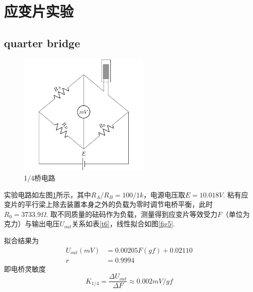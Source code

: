 \documentclass[12pt, a4paper]{ctexart}
\begin{document}
\section{应变片实验}
\subsection{quarter bridge}

\begin{figure}
    \includegraphics[width=2.5in]{figure/quarter bridge.png}
    \caption{1/4桥电路}
    \label{fig4}
\end{figure}

实验电路如左图\ref{fig4}所示，其中$R_A/R_B = 100/1k$，电源电压取$E = 10.018V$.
粘有应变片的平行梁上除去装置本身之外的负载为零时调节电桥平衡，此时$R_0 = 3733.9\Omega$.
取不同质量的砝码作为负载，测量得到应变片等效受力$F$（单位为克力）与输出电压$U_{out}$关系如表\ref{t6}，线性拟合如图\ref{fig5}.

拟合结果为
\begin{align*}
    U_{out}(mV) &= 0.00205F(gf) + 0.02110 \\
    r &= 0.9994
\end{align*}
即电桥灵敏度
\begin{equation*}
    K_{1/4} = \frac{\Delta U_{out}}{\Delta F} \approx 0.002mV/gf
\end{equation*}
\end{document}
